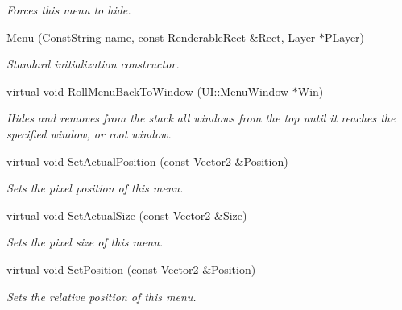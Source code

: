 \begin{DoxyCompactItemize}
\begin{DoxyCompactList}\small\item\em Forces this menu to hide. \item\end{DoxyCompactList}\item 
\hyperlink{classphys_1_1UI_1_1Menu_abe99c5c7a18947dde5d3f44ce6fa0727}{Menu} (\hyperlink{namespacephys_a5ce5049f8b4bf88d6413c47b504ebb31}{ConstString} name, const \hyperlink{structphys_1_1UI_1_1RenderableRect}{RenderableRect} \&Rect, \hyperlink{classphys_1_1UI_1_1Layer}{Layer} $\ast$PLayer)
\begin{DoxyCompactList}\small\item\em Standard initialization constructor. \item\end{DoxyCompactList}\item 
virtual void \hyperlink{classphys_1_1UI_1_1Menu_a7eb3efc2675bf281a829f69416b46327}{RollMenuBackToWindow} (\hyperlink{classphys_1_1UI_1_1MenuWindow}{UI::MenuWindow} $\ast$Win)
\begin{DoxyCompactList}\small\item\em Hides and removes from the stack all windows from the top until it reaches the specified window, or root window. \item\end{DoxyCompactList}\item 
virtual void \hyperlink{classphys_1_1UI_1_1Menu_a1d5434382755df214b169d3e9901c1e1}{SetActualPosition} (const \hyperlink{classphys_1_1Vector2}{Vector2} \&Position)
\begin{DoxyCompactList}\small\item\em Sets the pixel position of this menu. \item\end{DoxyCompactList}\item 
virtual void \hyperlink{classphys_1_1UI_1_1Menu_acc3fb39539fd3c13def35be54570ae81}{SetActualSize} (const \hyperlink{classphys_1_1Vector2}{Vector2} \&Size)
\begin{DoxyCompactList}\small\item\em Sets the pixel size of this menu. \item\end{DoxyCompactList}\item 
virtual void \hyperlink{classphys_1_1UI_1_1Menu_a53ff13bb9b850fb8196c1c0c637afbd5}{SetPosition} (const \hyperlink{classphys_1_1Vector2}{Vector2} \&Position)
\begin{DoxyCompactList}\small\item\em Sets the relative position of this menu. \item\end{DoxyCompactList}\item 

\end{DoxyCompactItemize}
